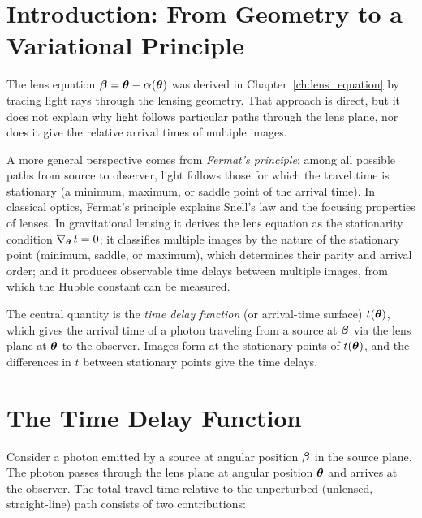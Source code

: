 \section{Introduction: From Geometry to a Variational Principle}
\label{sec:fermat_intro}

The lens equation $\boldsymbol{\beta} = \boldsymbol{\theta} - \boldsymbol{\alpha}(\boldsymbol{\theta})$ was
derived in Chapter~\ref{ch:lens_equation} by tracing light rays through
the lensing geometry.  That approach is direct, but it does not explain
why light follows particular paths through the lens plane, nor does it
give the relative arrival times of multiple images.

A more general perspective comes from \emph{Fermat's principle}: among all
possible paths from source to observer, light follows those for which the
travel time is stationary (a minimum, maximum, or saddle point
of the arrival time).  In classical optics, Fermat's principle explains
Snell's law and the focusing properties of lenses.  In gravitational
lensing it derives the lens equation as the stationarity condition
$\nabla_{\boldsymbol{\theta}}\, t = 0$; it classifies multiple images by the nature
of the stationary point (minimum, saddle, or maximum), which determines
their parity and arrival order; and it produces observable time delays
between multiple images, from which the Hubble constant can be measured.

The central quantity is the \emph{time delay function} (or
arrival-time surface) $t(\boldsymbol{\theta})$, which gives the arrival
time of a photon traveling from a source at $\boldsymbol{\beta}$ via the lens
plane at $\boldsymbol{\theta}$ to the observer.  Images form at the stationary
points of $t(\boldsymbol{\theta})$, and the differences in $t$ between stationary
points give the time delays.


\section{The Time Delay Function}
\label{sec:time_delay_function}

Consider a photon emitted by a source at angular position $\boldsymbol{\beta}$ in
the source plane.  The photon passes through the lens plane at angular
position $\boldsymbol{\theta}$ and arrives at the observer.  The total travel time
relative to the unperturbed (unlensed, straight-line) path consists of
two contributions:

